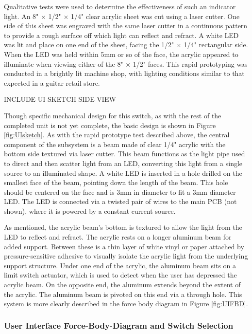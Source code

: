 \documentclass{article}
\begin{document}
	Qualitative tests were used to determine the effectiveness of such an indicator light.  An 8" $\times$ 1/2" $\times$ 1/4" clear acrylic sheet was cut using a laser cutter.  One side of this sheet was engraved with the same laser cutter in a continuous pattern to provide a rough surface off which light can reflect and refract.  A white LED was lit and place on one end of the sheet, facing the 1/2" $\times$ 1/4" rectangular side.  When the LED was held within 5mm or so of the face, the acrylic appeared to illuminate when viewing either of the 8" $\times$ 1/2" faces.  This rapid prototyping was conducted in a brightly lit machine shop, with lighting conditions similar to that expected in a guitar retail store.

	INCLUDE UI SKETCH SIDE VIEW

	Though specific mechanical design for this switch, as with the rest of the completed unit is not yet complete, the basic design is shown in Figure \ref{fig:UIsketch}.  As with the rapid prototype test described above, the central component of the subsystem is a beam made of clear 1/4" acrylic with the bottom side textured via laser cutter.  This beam functions as the light pipe used to direct and then scatter light from an LED, converting this light from a single source to an illuminated shape.  A white LED is inserted in a hole drilled on the smallest face of the beam, pointing down the length of the beam.  This hole should be centered on the face and is 3mm in diameter to fit a 3mm diameter LED.  The LED is connected via a twisted pair of wires to the main PCB (not shown), where it is powered by a constant current source.

	As mentioned, the acrylic beam's bottom is textured to allow the light from the LED to reflect and refract.  The acrylic rests on a longer aluminum beam for added support.  Between these is a thin layer of white vinyl or paper attached by pressure-sensitive adhesive to visually isolate the acrylic light from the underlying support structure.  Under one end of the acrylic, the aluminum beam sits on a limit switch actuator, which is used to detect when the user has depressed the acrylic beam.  On the opposite end, the aluminum extends beyond the extent of the acrylic.  The aluminum beam is pivoted on this end via a through hole.  This system is more clearly described in the force body diagram in Figure \ref{fig:UIFBD}.

	\subsubsection{User Interface Force-Body-Diagram and Switch Selection}
\end{document}
